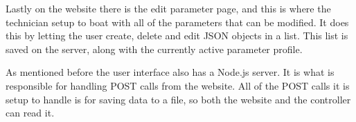 Lastly on the website there is the edit parameter page, and this is where the technician setup to boat with all of the parameters that can be modified. It does this by letting the user create, delete and edit JSON objects in a list. This list is saved on the server, along with the currently active parameter profile. 

As mentioned before the user interface also has a Node.js server\cite{nodejs}. It is what is responsible for handling POST calls from the website. All of the POST calls it is setup to handle is for saving data to a file, so both the website and the controller can read it.



